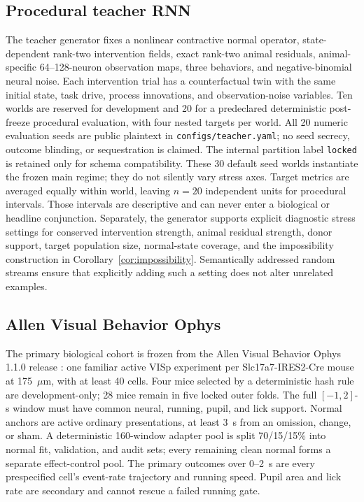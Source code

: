 \documentclass[11pt]{article}
\newcommand{\code}[1]{\texttt{#1}}
\begin{document}


\subsection{Procedural teacher RNN}

The teacher generator fixes a nonlinear contractive normal operator,
state-dependent rank-two intervention fields, exact rank-two animal residuals,
animal-specific 64--128-neuron observation maps, three behaviors, and
negative-binomial neural noise. Each intervention trial has a counterfactual
twin with the same initial state, task drive, process innovations, and
observation-noise variables. Ten worlds are reserved for development and 20
for a predeclared deterministic post-freeze procedural evaluation, with four
nested targets per world. All 20 numeric evaluation seeds are public plaintext
in \code{configs/teacher.yaml}; no seed secrecy, outcome blinding, or
sequestration is claimed. The internal partition label \code{locked} is
retained only for schema compatibility. These 30 default seed worlds
instantiate the frozen main regime; they do not silently vary stress axes.
Target metrics are averaged equally within world, leaving \(n=20\)
independent units for procedural intervals. Those intervals are descriptive
and can never enter a biological or headline conjunction. Separately, the
generator supports explicit diagnostic stress settings for conserved
intervention strength, animal residual strength, donor support, target
population size, normal-state coverage, and the impossibility construction in
Corollary~\ref{cor:impossibility}. Semantically addressed random streams
ensure that explicitly adding such a setting does not alter unrelated
examples.

\subsection{Allen Visual Behavior Ophys}

The primary biological cohort is frozen from the Allen Visual Behavior Ophys
1.1.0 release \citep{allenVBOrelease}: one familiar active VISp experiment per
Slc17a7-IRES2-Cre mouse
at 175~\(\mu\)m, with at least 40 cells. Four mice selected by a deterministic
hash rule are development-only; 28 mice remain in five locked outer folds.
The full \([-1,2]\)-s window must have common neural, running, pupil, and lick
support. Normal anchors are active ordinary presentations, at least 3~s from
an omission, change, or sham. A deterministic 160-window adapter pool is split
70/15/15\% into normal fit, validation, and audit sets; every remaining clean
normal forms a separate effect-control pool. The primary outcomes over
\(0\)--2~s are every prespecified cell's event-rate trajectory and running
speed. Pupil area and lick rate are secondary and cannot rescue a failed
running gate.
\end{document}

